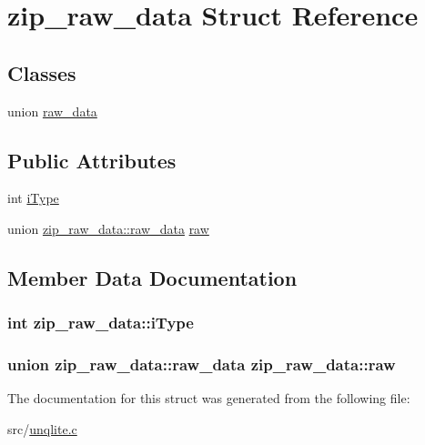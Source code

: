 \hypertarget{structzip__raw__data}{\section{zip\-\_\-raw\-\_\-data Struct Reference}
\label{d5/d37/structzip__raw__data}
}
\subsection*{Classes}
\begin{DoxyCompactItemize}
\item 
union \hyperlink{unionzip__raw__data_1_1raw__data}{raw\-\_\-data}
\end{DoxyCompactItemize}
\subsection*{Public Attributes}
\begin{DoxyCompactItemize}
\item 
int \hyperlink{structzip__raw__data_a253610a7af12f785d3b1bc93423cae87}{i\-Type}
\item 
union \hyperlink{unionzip__raw__data_1_1raw__data}{zip\-\_\-raw\-\_\-data\-::raw\-\_\-data} \hyperlink{structzip__raw__data_a88049e279254b6cb76b69359efc19e9e}{raw}
\end{DoxyCompactItemize}


\subsection{Member Data Documentation}
\hypertarget{structzip__raw__data_a253610a7af12f785d3b1bc93423cae87}{
\subsubsection[{i\-Type}]{\setlength{\rightskip}{0pt plus 5cm}int zip\-\_\-raw\-\_\-data\-::i\-Type}}\label{d5/d37/structzip__raw__data_a253610a7af12f785d3b1bc93423cae87}
\hypertarget{structzip__raw__data_a88049e279254b6cb76b69359efc19e9e}{
\subsubsection[{raw}]{\setlength{\rightskip}{0pt plus 5cm}union {\bf zip\-\_\-raw\-\_\-data\-::raw\-\_\-data} zip\-\_\-raw\-\_\-data\-::raw}}\label{d5/d37/structzip__raw__data_a88049e279254b6cb76b69359efc19e9e}


The documentation for this struct was generated from the following file\-:\begin{DoxyCompactItemize}
\item 
src/\hyperlink{unqlite_8c}{unqlite.\-c}\end{DoxyCompactItemize}
